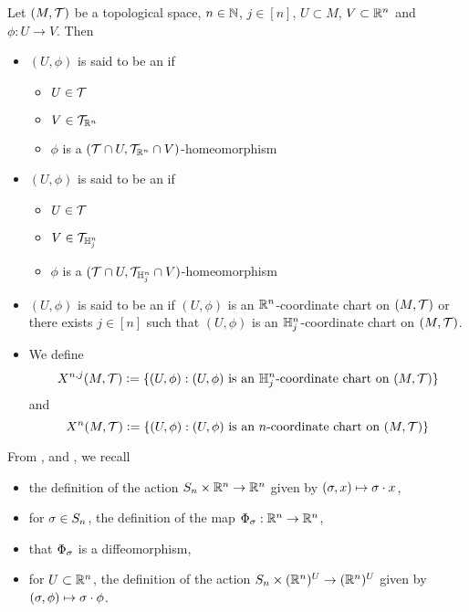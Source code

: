 \documentclass{book}
\begin{document}
	\begin{defn} 
		Let $(M, \mathcal{T})$ be a topological space, $n \in \mathbb{N}$, $j \in [n]$, $U \subset M$, $V \subset \mathbb{R}^n $ and $\phi:U \rightarrow V$. Then
		\begin{itemize}
			\item $(U, \phi)$ is said to be an  if 
			\begin{itemize}
				\item $U \in \mathcal{T}$ 
				\item $V \in \mathcal{T}_{\mathbb{R}^n}$ 
				\item $\phi$ is a $(\mathcal{T} \cap U, \mathcal{T}_{\mathbb{R}^n} \cap V)$-homeomorphism 
			\end{itemize}
			\item $(U, \phi)$ is said to be an  if 
			\begin{itemize}
				\item $U \in \mathcal{T}$ 
				\item $V \in \mathcal{T}_{\mathbb{H}^n_j}$ 
				\item $\phi$ is a $(\mathcal{T} \cap U, \mathcal{T}_{\mathbb{H}^n_j } \cap V)$-homeomorphism 
			\end{itemize}
			\item $(U, \phi)$ is said to be an  if $(U, \phi)$ is an $\mathbb{R}^n$-coordinate chart on $(M, \mathcal{T})$ or there exists $j \in [n]$ such that $(U, \phi)$ is an $\mathbb{H}^n_j$-coordinate chart on $(M, \mathcal{T})$.
			\item We define 
			$$X^{n,j}(M, \mathcal{T}) \vcentcolon= \{(U, \phi): (U, \phi) \text{ is an $\mathbb{H}^n_j$-coordinate chart on $(M, \mathcal{T})$} \}$$
			and 
			$$X^n(M, \mathcal{T}) \vcentcolon= \{(U, \phi): (U, \phi) \text{ is an $n$-coordinate chart on $(M, \mathcal{T})$} \}$$
		\end{itemize}
	\end{defn}

	\begin{note}
		From ,  and , we recall 
		\begin{itemize}
			\item the definition of the action $S_n \times \mathbb{R}^n \rightarrow \mathbb{R}^n$ given by $(\sigma, x) \mapsto \sigma \cdot x$,
			\item for $\sigma \in S_n$, the definition of  the map $\Phi_{\sigma}: \mathbb{R}^n \rightarrow \mathbb{R}^n$,
			\item that $\Phi_{\sigma}$ is a diffeomorphism,
			\item for $U \subset \mathbb{R}^n$, the definition of the action $S_n \times (\mathbb{R}^n)^U \rightarrow (\mathbb{R}^n)^U$ given by $(\sigma, \phi) \mapsto \sigma \cdot \phi$.
		\end{itemize}
	\end{note}
\end{document}
